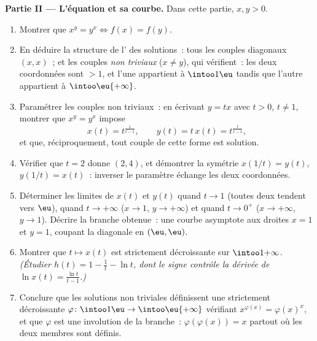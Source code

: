 \begin{problem}
\medskip
\noindent\textbf{Partie II --- L'équation et sa courbe.} Dans cette
partie, $x, y > 0$.
\begin{enumerate}[resume]
  \item Montrer que $x^y = y^x \iff f(x) = f(y)$.
  \item En déduire la structure de l' des solutions~: tous
        les couples diagonaux $(x, x)$~; et les couples \emph{non
        triviaux} ($x \neq y$), qui vérifient~: les deux coordonnées
        sont $> 1$, et l'une appartient à $\intoo1\eu$ tandis que
        l'autre appartient à $\intoo\eu{+\infty}$.
  \item Paramétrer les couples non triviaux~: en écrivant $y = tx$
        avec $t > 0$, $t \neq 1$, montrer que $x^y = y^x$ impose
        \[
        x(t) = t^{\frac1{t-1}},
        \qquad
        y(t) = t\,x(t) = t^{\frac{t}{t-1}},
        \]
        et que, réciproquement, tout couple de cette forme est
        solution.
  \item Vérifier que $t = 2$ donne $(2, 4)$, et démontrer la
        symétrie $x(1/t) = y(t)$, $y(1/t) = x(t)$~: inverser le
        paramètre échange les deux coordonnées.
  \item Déterminer les limites de $x(t)$ et $y(t)$ quand $t \to 1$
        (toutes deux tendent vers $\eu$), quand $t \to +\infty$
        ($x \to 1$, $y \to +\infty$) et quand $t \to 0^+$ ($x \to
        +\infty$, $y \to 1$). Décrire la branche obtenue~: une
        courbe asymptote aux droites $x = 1$ et $y = 1$, coupant la
        diagonale en $(\eu, \eu)$.
  \item Montrer que $t \mapsto x(t)$ est strictement décroissante
        sur $\intoo1{+\infty}$. \emph{(Étudier $h(t) = 1 - \frac1t -
        \ln t$, dont le signe contrôle la dérivée de $\ln x(t) =
        \frac{\ln t}{t - 1}$.)}
  \item Conclure que les solutions non triviales définissent une
         strictement décroissante $\varphi \colon
        \intoo1\eu \to \intoo\eu{+\infty}$ vérifiant
        $x^{\varphi(x)} = \varphi(x)^x$, et que $\varphi$ est une
        involution de la branche~: $\varphi(\varphi(x)) = x$ partout
        où les deux membres sont définis.
\end{enumerate}


\end{problem}
